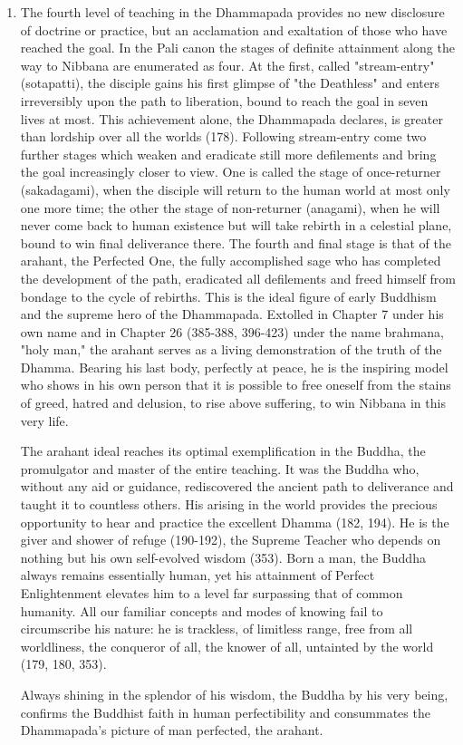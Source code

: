 \begin{enumerate}[i]
\item The fourth level of teaching in the Dhammapada provides no new disclosure of doctrine or practice, but an acclamation and exaltation of those who have reached the goal. In the Pali canon the stages of definite attainment along the way to Nibbana are enumerated as four. At the first, called "stream-entry" (sotapatti), the disciple gains his first glimpse of "the Deathless" and enters irreversibly upon the path to liberation, bound to reach the goal in seven lives at most. This achievement alone, the Dhammapada declares, is greater than lordship over all the worlds (178). Following stream-entry come two further stages which weaken and eradicate still more defilements and bring the goal increasingly closer to view. One is called the stage of once-returner (sakadagami), when the disciple will return to the human world at most only one more time; the other the stage of non-returner (anagami), when he will never come back to human existence but will take rebirth in a celestial plane, bound to win final deliverance there. The fourth and final stage is that of the arahant, the Perfected One, the fully accomplished sage who has completed the development of the path, eradicated all defilements and freed himself from bondage to the cycle of rebirths. This is the ideal figure of early Buddhism and the supreme hero of the Dhammapada. Extolled in Chapter 7 under his own name and in Chapter 26 (385-388, 396-423) under the name brahmana, "holy man," the arahant serves as a living demonstration of the truth of the Dhamma. Bearing his last body, perfectly at peace, he is the inspiring model who shows in his own person that it is possible to free oneself from the stains of greed, hatred and delusion, to rise above suffering, to win Nibbana in this very life.

The arahant ideal reaches its optimal exemplification in the Buddha, the promulgator and master of the entire teaching. It was the Buddha who, without any aid or guidance, rediscovered the ancient path to deliverance and taught it to countless others. His arising in the world provides the precious opportunity to hear and practice the excellent Dhamma (182, 194). He is the giver and shower of refuge (190-192), the Supreme Teacher who depends on nothing but his own self-evolved wisdom (353). Born a man, the Buddha always remains essentially human, yet his attainment of Perfect Enlightenment elevates him to a level far surpassing that of common humanity. All our familiar concepts and modes of knowing fail to circumscribe his nature: he is trackless, of limitless range, free from all worldliness, the conqueror of all, the knower of all, untainted by the world (179, 180, 353).

Always shining in the splendor of his wisdom, the Buddha by his very being, confirms the Buddhist faith in human perfectibility and consummates the Dhammapada's picture of man perfected, the arahant.

\end{enumerate}

